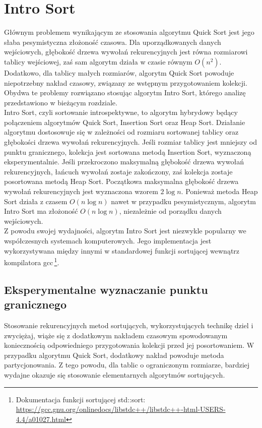 \newpage
\section{Intro Sort}
Głównym problemem wynikającym ze stosowania algorytmu Quick Sort jest jego słaba pesymistyczna złożoność czasowa. Dla uporządkowanych danych wejściowych, głębokość drzewa wywołań rekurencyjnych jest równa rozmiarowi tablicy wejściowej, zaś sam algorytm działa w czasie równym $O(n^2)$. Dodatkowo, dla tablicy małych rozmiarów, algorytm Quick Sort powoduje niepotrzebny nakład czasowy, związany ze wstępnym przygotowaniem kolekcji. Obydwa te problemy rozwiązano stosując algorytm Intro Sort, którego analizę przedstawiono w bieżącym rozdziale.\\

Intro Sort, czyli sortowanie introspektywne, to algorytm hybrydowy będący połączeniem algorytmów Quick Sort, Insertion Sort oraz Heap Sort. Działanie algorytmu dostosowuje się w zależności od rozmiaru sortowanej tablicy oraz głębokości drzewa wywołań rekurencyjnych. Jeśli rozmiar tablicy jest mniejszy od punktu granicznego, kolekcja jest sortowana metodą Insertion Sort, wyznaczoną eksperymentalnie. Jeśli przekroczono maksymalną głębokość drzewa wywołań rekurencyjnych, łańcuch wywołań zostaje zakończony, zaś kolekcja zostaje posortowana metodą Heap Sort. Początkowa maksymalna głębokość drzewa wywołań rekurencyjnych jest wyznaczona wzorem $2\log{n}$. Ponieważ metoda Heap Sort działa z czasem $O(n\log{n})$ nawet w przypadku pesymistycznym, algorytm Intro Sort ma złożoność $O(n\log{n})$, niezależnie od porządku danych wejściowych.\\

Z powodu swojej wydajności, algorytm Intro Sort jest niezwykle popularny we współczesnych systemach komputerowych. Jego implementacja jest wykorzystywana między innymi w standardowej funkcji sortującej  wewnątrz kompilatora gcc\,\footnote{Dokumentacja funkcji sortującej std::sort: \url{https://gcc.gnu.org/onlinedocs/libstdc++/libstdc++-html-USERS-4.4/a01027.html}}.\\


\subsection{Eksperymentalne wyznaczanie punktu granicznego}
Stosowanie rekurencyjnych metod sortujących, wykorzystujących technikę dziel i zwyciężaj, wiąże się z dodatkowym nakładem czasowym spowodowanym koniecznością odpowiedniego przygotowania kolekcji przed jej posortowaniem. W przypadku algorytmu Quick Sort, dodatkowy nakład powoduje metoda partycjonowania. Z tego powodu, dla tablic o ograniczonym rozmiarze, bardziej wydajne okazuje się stosowanie elementarnych algorytmów sortujących.\\

